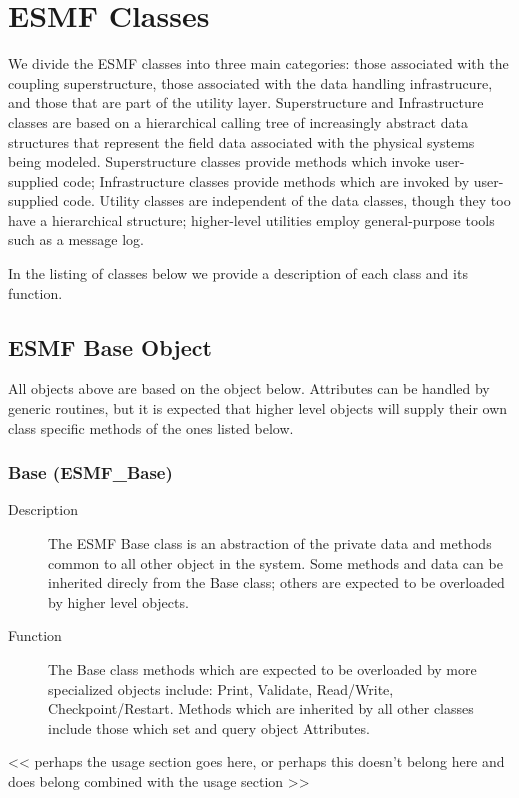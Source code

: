 \section{ESMF Classes}

We divide the ESMF classes into three main categories: those associated 
with the coupling superstructure, those associated with the data handling
infrastrucure, and those that are part of the utility layer.  
Superstructure and Infrastructure
classes are based on a hierarchical 
calling tree of increasingly abstract data structures that represent the field data associated 
with the physical systems being modeled.  
Superstructure classes provide methods which invoke user-supplied code;
Infrastructure classes provide methods which are invoked by
user-supplied code.
Utility classes are independent 
of the data classes, though they too have a hierarchical structure; 
higher-level utilities employ general-purpose tools such as a message log.

In the listing of classes below we provide a description of each class and its function.

\subsection{ESMF Base Object}

All objects above are based on the object below.  Attributes
can be handled by generic routines, but it is expected that 
higher level objects will supply their own class specific
methods of the ones listed below.


\subsubsection{Base (ESMF\_Base)}
\label{sec:Base} 
\begin{description}
\item [Description] The ESMF Base class is an abstraction of the private data and
methods common to all other object in the system.  Some methods and data can be
inherited direcly from the Base class; others are expected to be overloaded by
higher level objects.
\item [Function] The Base class methods which are expected to be overloaded by
more specialized objects include: Print, Validate, Read/Write, Checkpoint/Restart.
Methods which are inherited by all other classes include those which 
set and query object Attributes.
\end{description}

<< perhaps the usage section goes here, or perhaps this doesn't
belong here and does belong combined with the usage section >>







